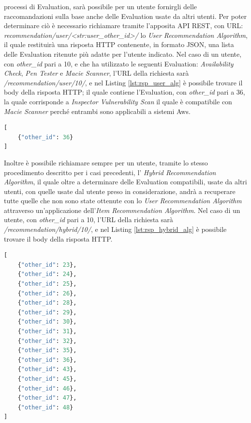 processi di Evaluation, sarà possibile per un utente fornirgli delle raccomandazioni sulla base anche delle Evaluation usate da 
altri utenti. Per poter determinare ciò è necessario richiamare tramite l'apposita API REST, con URL: 
\textit{recommendation/user/<str:user\_other\_id>/} lo \textit{User Recommendation Algorithm}, il quale restituirà una 
risposta HTTP contenente, in formato JSON, una lista delle Evaluation ritenute più adatte per l'utente indicato. 
Nel caso di un utente, con \textit{other\_id} pari a 10, e che ha utilizzato le seguenti Evaluation: \textit{Availability Check},
\textit{Pen Tester} e \textit{Macie Scanner}, l'URL della richiesta sarà 
\textit{/recommendation/user/10/}, e nel Listing \ref{lst:rsp_user_alg} è possibile trovare il body della risposta HTTP; il quale 
contiene l'Evaluation, con \textit{other\_id} pari a 36, la quale corrisponde a \textit{Inspector Vulnerability Scan} il quale 
è compatibile con \textit{Macie Scanner} perché entrambi sono applicabili a sistemi Aws.
\begin{lstlisting}[language=Python, label=lst:rsp_user_alg, caption={Esempio di risposta HTTP alla chiamata del 
    \textit{User Recommendation Algorithm}}]
[
    {"other_id": 36}
]
\end{lstlisting}
Inoltre è possibile richiamare sempre per un utente, tramite lo stesso procedimento descritto per i casi precedenti, 
l' \textit{Hybrid Recommendation Algorithm}, il quale oltre a determinare delle Evaluation compatibili, usate da altri 
utenti, con quelle usate dal utente preso in considerazione, andrà a recuperare tutte quelle che non sono state ottenute con lo
\textit{User Recommendation Algorithm} attraverso un'applicazione dell'\textit{Item Recommendation Algorithm}. Nel caso di 
un utente, con \textit{other\_id} pari a 10, l'URL della richiesta sarà 
\textit{/recommendation/hybrid/10/}, e nel Listing \ref{lst:rsp_hybrid_alg} è possibile trovare il body della risposta HTTP.
\begin{lstlisting}[language=Python, label=lst:rsp_hybrid_alg, caption={Esempio di risposta HTTP alla chiamata del 
    \textit{Hybrid Recommendation Algorithm}}]
[
    {"other_id": 23},
    {"other_id": 24},
    {"other_id": 25},
    {"other_id": 26},
    {"other_id": 28},
    {"other_id": 29},
    {"other_id": 30},
    {"other_id": 31},
    {"other_id": 32},
    {"other_id": 35},
    {"other_id": 36},
    {"other_id": 43},
    {"other_id": 45},
    {"other_id": 46},
    {"other_id": 47},
    {"other_id": 48}
]
\end{lstlisting}

